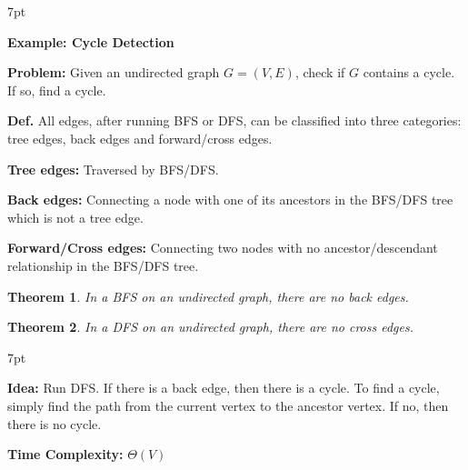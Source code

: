 \documentclass[10pt]{article}
\newtheorem*{theorem}{Theorem}
\newenvironment{formal}[2]{%
	\def\FrameCommand{%
		\hspace{1pt}%
		{\color{#1}\vrule width 2pt}%
		{\color{#2}\vrule width 4pt}%
		\colorbox{#2}%
	}%
	\MakeFramed{\advance\hsize-\width\FrameRestore}%
	\noindent\hspace{-4.55pt}%
	\begin{adjustwidth}{}{7pt}%
		\vspace{2pt}\vspace{2pt}%
	}
	{%
		\vspace{2pt}\end{adjustwidth}\endMakeFramed%
}
\begin{document}
\begin{formal}{Brown}{brownshade}
	
	\textbf{Example: Cycle Detection}

	\textbf{Problem:} Given an undirected graph $G = (V, E)$, check if $G$ contains a cycle. If so, find a cycle.

	\textbf{Def.} All edges, after running BFS or DFS, can be classified into three categories: tree edges, back edges and forward/cross edges.

	\textbf{Tree edges:} Traversed by BFS/DFS.

	\textbf{Back edges:} Connecting a node with one of its ancestors in the BFS/DFS tree which is not a tree edge.

	\textbf{Forward/Cross edges:} Connecting two nodes with no ancestor/descendant relationship in the BFS/DFS tree.

\end{formal}

\begin{theorem}
	In a BFS on an undirected graph, there are no back edges.
\end{theorem}

\begin{theorem}
	In a DFS on an undirected graph, there are no cross edges.
\end{theorem}

\begin{formal}{Brown}{brownshade}

	\textbf{Idea:} Run DFS. If there is a back edge, then there is a cycle. To find a cycle, simply find the path from the current vertex to the ancestor vertex. If no, then there is no cycle.

	\textbf{Time Complexity:} $\Theta(V)$

\end{formal}
\end{document}
